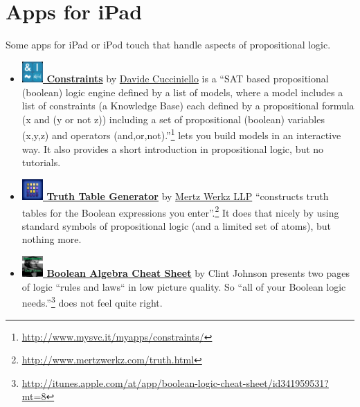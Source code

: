 \section{Apps for iPad}
 
Some apps for iPad or iPod touch that handle aspects of propositional logic.

\begin{itemize}

\item  \href{http://itunes.apple.com/at/app/constraints/id418722652?mt=8}{\bf 
\includegraphics[width=0.8cm]{related/Constraints.png} Constraints}
by 
\href{http://www.mysvc.it/myapps/constraints/}{Davide Cucciniello} 
is a “SAT based propositional (boolean) logic engine defined by a list of models, 
where a model includes a list of constraints (a Knowledge Base) 
each defined by a propositional formula (x and (y or not z)) 
including a set of propositional (boolean) variables (x,y,z) 
and operators (and,or,not).”\footnote{
\url{http://www.mysvc.it/myapps/constraints/}} 
lets you build models in an interactive way. It also provides a short introduction in propositional logic, but no tutorials.


\item \href{http://itunes.apple.com/at/app/truth-table-generator/id507190346?mt=8}{\bf 
\includegraphics[width=0.8cm]{related/TruthTables.png} Truth Table Generator} 
by
\href{http://www.mertzwerkz.com/truth.html}{Mertz Werkz LLP}    
“constructs truth tables for the Boolean expressions you enter”.\footnote{
\url{http://www.mertzwerkz.com/truth.html}}
It does that nicely by using standard symbols of propositional logic (and a limited set of atoms), but nothing more.

\item
\href{http://itunes.apple.com/at/app/boolean-logic-cheat-sheet/id341959531?mt=8}{\bf 
\includegraphics[width=0.8cm]{related/CheatSheet.png} Boolean Algebra Cheat Sheet} 
by 
{Clint Johnson} presents two pages of logic “rules and laws“ in low picture quality. So “all of your Boolean 
logic needs.”\footnote{
\url{http://itunes.apple.com/at/app/boolean-logic-cheat-sheet/id341959531?mt=8}} 
does not feel quite right.


\end{itemize}
